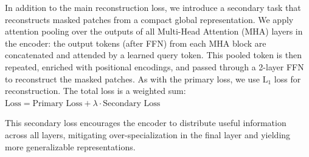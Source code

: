 \documentclass{article}
\begin{document}

In addition to the main reconstruction loss, we introduce a secondary task that reconstructs masked patches from a compact global representation. We apply attention pooling over the outputs of all Multi-Head Attention (MHA) layers in the encoder: the output tokens (after FFN) from each MHA block are concatenated and attended by a learned query token. This pooled token is then repeated, enriched with positional encodings, and passed through a 2-layer FFN to reconstruct the masked patches. As with the primary loss, we use $\text{L}_1$ loss for reconstruction. The total loss is a weighted sum: $\text{Loss} = \text{Primary Loss} + \lambda \cdot \text{Secondary Loss}$

This secondary loss encourages the encoder to distribute useful information across all layers, mitigating over-specialization in the final layer and yielding more generalizable representations.

\end{document}
